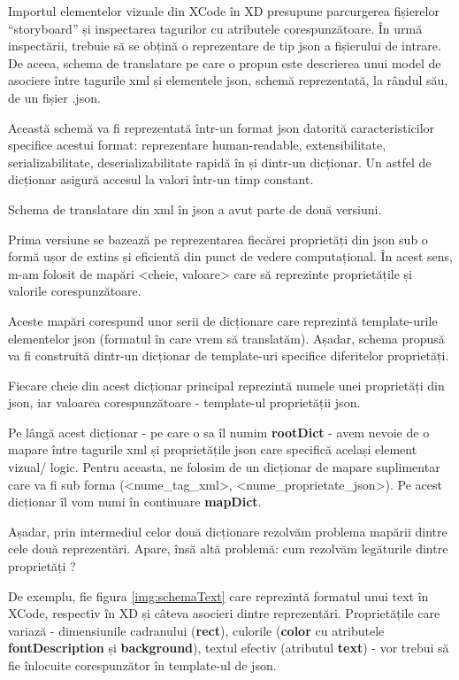 Importul elementelor vizuale din XCode în XD presupune parcurgerea fișierelor “storyboard” și inspectarea tagurilor cu atributele corespunzătoare. În urmă inspectării, trebuie să se obțină o reprezentare de tip json a fișierului de intrare.  De aceea, schema de translatare pe care o propun este descrierea unui model de asociere între tagurile xml și elementele json, schemă reprezentată, la rândul său, de un fișier .json.  

Această schemă va fi reprezentată într-un format json datorită caracteristicilor specifice acestui format: reprezentare human-readable, extensibilitate, serializabilitate, deserializabilitate rapidă în și dintr-un dicționar. Un astfel de dicționar asigură accesul la valori într-un timp constant.

Schema de translatare din xml în json a avut parte de două versiuni. 

Prima versiune se bazează pe reprezentarea fiecărei proprietăți din json sub o formă ușor de extins și eficientă din punct de vedere computațional. În acest sens, m-am folosit de mapări <cheie, valoare> care să reprezinte proprietățile și valorile corespunzătoare.

Aceste mapări corespund unor serii de dicționare care reprezintă template-urile elementelor json (formatul în care vrem să translatăm). Așadar, schema propusă va fi construită dintr-un dicționar de template-uri specifice diferitelor proprietăți. 

Fiecare cheie din acest dicționar principal reprezintă numele unei proprietăți din json, iar valoarea corespunzătoare - template-ul proprietății json. 

Pe lângă acest dicționar - pe care o sa îl numim \textbf{rootDict} - avem nevoie de o mapare între tagurile xml și proprietățile json care specifică același element vizual/ logic. Pentru aceasta, ne folosim de un dicționar de mapare suplimentar care va fi sub forma (<nume_tag_xml>,  <nume_proprietate_json>). Pe acest dicționar îl vom numi în continuare \textbf{mapDict}.

Așadar, prin intermediul celor două dicționare rezolvăm problema mapării dintre cele două reprezentări. Apare, însă altă problemă: cum rezolvăm legăturile dintre proprietăți ?





De exemplu, fie figura \ref{img:schemaText} care reprezintă formatul unui text în XCode, respectiv în XD și câteva asocieri dintre reprezentări.
Proprietățile care variază - dimensiunile cadranului (\textbf{rect}), culorile (\textbf{color} cu atributele \textbf{fontDescription} și \textbf{background}), textul efectiv (atributul \textbf{text}) - vor trebui să fie înlocuite corespunzător în template-ul de json.


